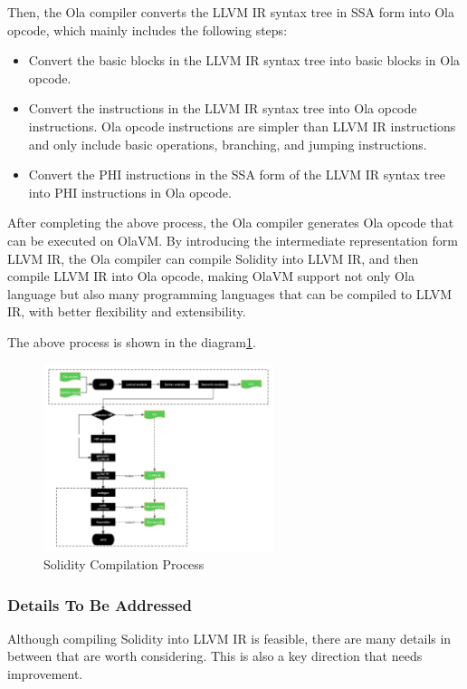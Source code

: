 Then, the Ola compiler converts the LLVM IR syntax tree in SSA form into Ola opcode, which mainly includes the following steps:
\begin{itemize}
    \item Convert the basic blocks in the LLVM IR syntax tree into basic blocks in Ola opcode.
    \item Convert the instructions in the LLVM IR syntax tree into Ola opcode instructions. Ola opcode instructions are simpler than LLVM IR instructions and only include basic operations, branching, and jumping instructions.
    \item Convert the PHI instructions in the SSA form of the LLVM IR syntax tree into PHI instructions in Ola opcode.
\end{itemize}
After completing the above process, the Ola compiler generates Ola opcode that can be executed on OlaVM. By introducing the intermediate representation form LLVM IR, the Ola compiler can compile Solidity into LLVM IR, and then compile LLVM IR into Ola opcode, making OlaVM support not only Ola language but also many programming languages that can be compiled to LLVM IR, with better flexibility and extensibility.

The above process is shown in the diagram\ref{fig:solidity-compile}.

\begin{figure}[!ht]
    \centering
    \includegraphics[width=0.6\textwidth]{images/solidity-compile.jpg}
    \caption{Solidity Compilation Process}
    \label{fig:solidity-compile}
\end{figure}

\subsubsection{Details To Be Addressed}

Although compiling Solidity into LLVM IR is feasible, there are many details in between that are worth considering. This is also a key direction that needs improvement.

